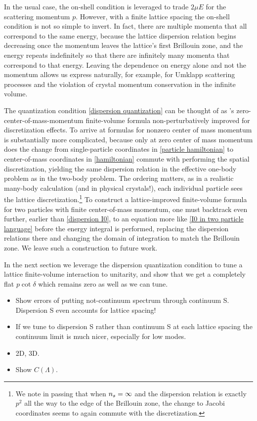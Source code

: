 In the usual case, the on-shell condition is leveraged to trade $2\mu E$ for the scattering momentum $p$.  However, with a finite lattice spacing the on-shell condition is not so simple to invert.
In fact, there are multiple momenta that all correspond to the same energy, because the lattice dispersion relation begins decreasing once the momentum leaves the lattice's first Brillouin zone, and the energy repeats indefinitely so that there are infinitely many momenta that correspond to that energy.
Leaving the dependence on energy alone and not the momentum allows us express naturally, for example, for Umklapp scattering processes and the violation of crystal momentum conservation in the infinite volume.

The quantization condition \eqref{dispersion quantization} can be thought of as \Luscher's zero-center-of-mass-momentum finite-volume formula non-perturbatively improved for discretization effects.
To arrive at formulas for nonzero center of mass momentum is substantially more complicated, because only at zero center of mass momentum does the change from single-particle coordinates in \eqref{particle hamiltonian} to center-of-mass coordinates in \eqref{hamiltonian} commute with performing the spatial discretization, yielding the same dispersion relation in the effective one-body problem as in the two-body problem.
The ordering matters, as in a realistic many-body calculation (and in physical crystals!), each individual particle sees the lattice discretization.\footnote{
We note in passing that when ${n_s}=\infty$ and the dispersion relation is exactly $p^2$ all the way to the edge of the Brillouin zone, the change to Jacobi coordinates seems to again commute with the discretization.}
To construct a lattice-improved finite-volume formula for two particles with finite center-of-mass momentum, one must backtrack even further, earlier than \eqref{dispersion I0}, to an equation more like \eqref{I0 in two particle language} before the energy integral is performed, replacing the dispersion relations there and changing the domain of integration to match the Brillouin zone.
We leave such a construction to future work.

In the next section we leverage the dispersion quantization condition to tune a lattice finite-volume interaction to unitarity, and show that we get a completely flat $p \cot \delta$ which remains zero as well as we can tune.

\begin{itemize}
    \item Show errors of putting not-continuum spectrum through continuum S.  Dispersion S even accounts for lattice spacing!
    \item If we tune to dispersion S rather than continuum S at each lattice spacing the continuum limit is much nicer, especially for low modes.
    \item 2D, 3D.
    \item Show $C(\Lambda)$.
\end{itemize}

